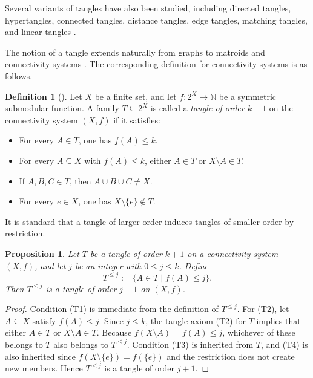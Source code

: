 \documentclass[10pt]{book}
\newtheorem{proposition}[theorem]{Proposition}
\theoremstyle{definition}
\newtheorem{definition}[theorem]{Definition}
\begin{document}
Several variants of tangles have also been studied, including directed tangles, hypertangles, connected tangles, distance tangles, edge tangles, matching tangles, and linear tangles \cite{giannopoulou2022directed,250,Fujitaconnected2024,Fujitadistance2024,liu2022global,fomin2019width,51}.

The notion of a tangle extends naturally from graphs to matroids and connectivity systems \cite{9}.  
The corresponding definition for connectivity systems is as follows.

\begin{definition}[\cite{9}]
Let \(X\) be a finite set, and let \(f:2^X\to \mathbb{N}\) be a symmetric submodular function.  
A family \(T\subseteq 2^X\) is called a \emph{tangle of order \(k+1\)} on the connectivity system \((X,f)\) if it satisfies:
\begin{itemize}
    \item[(T1)] For every \(A\in T\), one has \(f(A)\leq k\).
    \item[(T2)] For every \(A\subseteq X\) with \(f(A)\leq k\), either \(A\in T\) or \(X\setminus A\in T\).
    \item[(T3)] If \(A,B,C\in T\), then \(A\cup B\cup C \neq X\).
    \item[(T4)] For every \(e\in X\), one has \(X\setminus \{e\}\notin T\).
\end{itemize}
\end{definition}

It is standard that a tangle of larger order induces tangles of smaller order by restriction.

\begin{proposition}
Let \(T\) be a tangle of order \(k+1\) on a connectivity system \((X,f)\), and let \(j\) be an integer with \(0\leq j\leq k\).  
Define
\[
T^{\leq j}:=\{A\in T \mid f(A)\leq j\}.
\]
Then \(T^{\leq j}\) is a tangle of order \(j+1\) on \((X,f)\).
\end{proposition}

\begin{proof}
Condition (T1) is immediate from the definition of \(T^{\leq j}\).  
For (T2), let \(A\subseteq X\) satisfy \(f(A)\leq j\). Since \(j\leq k\), the tangle axiom (T2) for \(T\) implies that either \(A\in T\) or \(X\setminus A\in T\). Because \(f(X\setminus A)=f(A)\leq j\), whichever of these belongs to \(T\) also belongs to \(T^{\leq j}\).  
Condition (T3) is inherited from \(T\), and (T4) is also inherited since \(f(X\setminus\{e\})=f(\{e\})\) and the restriction does not create new members.  
Hence \(T^{\leq j}\) is a tangle of order \(j+1\).
\end{proof}
\end{document}
